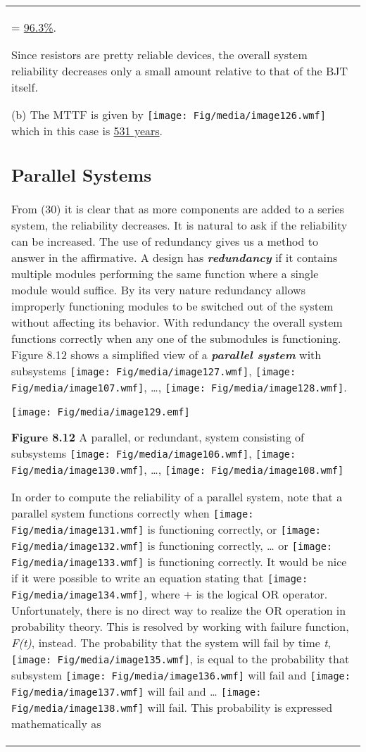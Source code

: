 \begin{table}
\begin{tabular}{m{15cm}|}
= \ul{96.3\%}.

Since resistors are pretty reliable devices, the overall system
reliability decreases only a small amount relative to that of the BJT
itself.

(b) The MTTF is given by \texttt{[image: Fig/media/image126.wmf]} which
in this case is \ul{531 years}.

\subsection{Parallel Systems}\label{parallel-systems}

From (30) it is clear that as more components are added to a series
system, the reliability decreases. It is natural to ask if the
reliability can be increased. The use of redundancy gives us a method to
answer in the affirmative. A design has \emph{\textbf{redundancy}} if it
contains multiple modules performing the same function where a single
module would suffice. By its very nature redundancy allows improperly
functioning modules to be switched out of the system without affecting
its behavior. With redundancy the overall system functions correctly
when any one of the submodules is functioning. Figure 8.12 shows a
simplified view of a \emph{\textbf{parallel system}} with subsystems
\texttt{[image: Fig/media/image127.wmf]},
\texttt{[image: Fig/media/image107.wmf]}, \ldots,
\texttt{[image: Fig/media/image128.wmf]}.

\texttt{[image: Fig/media/image129.emf]}

\textbf{Figure 8.12} A parallel, or redundant, system consisting of
subsystems \texttt{[image: Fig/media/image106.wmf]},
\texttt{[image: Fig/media/image130.wmf]}, \ldots,
\texttt{[image: Fig/media/image108.wmf]}

In order to compute the reliability of a parallel system, note that a
parallel system functions correctly when
\texttt{[image: Fig/media/image131.wmf]} is functioning correctly, or
\texttt{[image: Fig/media/image132.wmf]} is functioning correctly,
\ldots{} or \texttt{[image: Fig/media/image133.wmf]} is functioning
correctly. It would be nice if it were possible to write an equation
stating that \texttt{[image: Fig/media/image134.wmf]}\emph{,} where + is
the logical OR operator. Unfortunately, there is no direct way to
realize the OR operation in probability theory. This is resolved by
working with failure function, \emph{F(t)}, instead. The probability
that the system will fail by time \emph{t},
\texttt{[image: Fig/media/image135.wmf]}, is equal to the probability
that subsystem \texttt{[image: Fig/media/image136.wmf]} will fail and
\texttt{[image: Fig/media/image137.wmf]} will fail and \ldots{}
\texttt{[image: Fig/media/image138.wmf]} will fail. This probability is
expressed mathematically as


\end{tabular}
\end{table}

